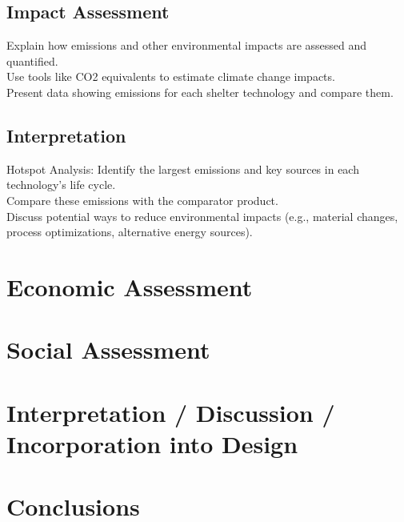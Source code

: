 \documentclass{article}
\begin{document}
\subsection{Impact Assessment}
Explain how emissions and other environmental impacts are assessed and quantified.\\[8pt]
Use tools like CO2 equivalents to estimate climate change impacts.\\[8pt]
Present data showing emissions for each shelter technology and compare them.
\subsection{Interpretation}
Hotspot Analysis: Identify the largest emissions and key sources in each technology’s life cycle.\\[8pt]
Compare these emissions with the comparator product.\\[8pt]
Discuss potential ways to reduce environmental impacts (e.g., material changes, process optimizations, alternative energy sources).

\newpage

\section{Economic Assessment}

\newpage

\section{Social Assessment}

\newpage

\section{Interpretation / Discussion / Incorporation into Design}

\newpage

\section{Conclusions}

\newpage
\end{document}
